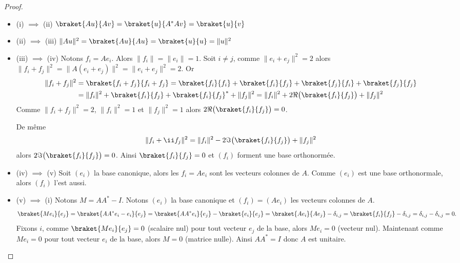 \documentclass[11pt,class=report,crop=false]{standalone}
\begin{document}
\begin{proof}~
\begin{itemize}
  \item (i) $\implies$ (ii) $\braket{Au}{Av} = \braket{u}{A^*Av} = \braket{u}{v}$

  \item (ii) $\implies$ (iii) $\| Au \|^2 = \braket{Au}{Au} = \braket{u}{u} = \| u \|^2$

  \item (iii) $\implies$ (iv) Notons $f_i = Ae_i$. Alors $\| f_i \| = \| e_i \| = 1$.
  Soit $i \neq j$, comme $\| e_i + e_j \|^2 = 2$ alors $\| f_i + f_j \|^2 = \| A(e_i + e_j) \|^2= \| e_i + e_j \|^2 =2$.
  Or
\begin{align*}
\|f_i+f_j\|^2 
&= \braket{f_i+f_j}{f_i+f_j} 
= \braket{f_i}{f_i} + \braket{f_i}{f_j} +\braket{f_j}{f_i} +\braket{f_j}{f_j} \\
&=  \|f_i\|^2 + \braket{f_i}{f_j} + \braket{f_i}{f_j}^* + \|f_j\|^2 
=  \|f_i\|^2 + 2\Re\big( \braket{f_i}{f_j} \big) + \|f_j\|^2 
\end{align*}
Comme $\|f_i+f_j\|^2 =2$, $\|f_i\|^2=1$ et $\|f_j\|^2=1$ alors $2\Re\big( \braket{f_i}{f_j}\big)=0$.

De même $$\|f_i+\ii f_j\|^2 =  \|f_i\|^2 - 2\Im\big( \braket{f_i}{f_j} \big) + \|f_j\|^2 $$ alors $2\Im\big( \braket{f_i}{f_j}\big)=0$. Ainsi $\braket{f_i}{f_j}=0$ et $(f_i)$ forment une base orthonormée.

  \item (iv) $\implies$ (v) Soit $(e_i)$ la base canonique, alors les $f_i = Ae_i$ sont les vecteurs colonnes de $A$. Comme $(e_i)$ est une base orthonormale, alors $(f_i)$ l'est aussi.

  \item (v) $\implies$ (i) 
  Notons $M = AA^* - I$. Notons $(e_i)$ la base canonique et $(f_i) = (Ae_i)$ les vecteurs colonnes de $A$.
$$\braket{Me_i}{e_j} 
= \braket{AA^*e_i - e_i}{e_j}
= \braket{AA^*e_i}{e_j} - \braket{e_i}{e_j}
= \braket{Ae_i}{Ae_j} - \delta_{i,j}
= \braket{f_i}{f_j} - \delta_{i,j}
= \delta_{i,j}- \delta_{i,j}
= 0.$$
 Fixons $i$, comme $\braket{Me_i}{e_j} = 0$ (scalaire nul) pour tout vecteur $e_j$ de la base, alors $Me_i=0$ (vecteur nul). Maintenant comme $Me_i=0$ pour tout vecteur $e_i$ de la base, alors $M=0$ (matrice nulle). Ainsi $AA^* = I$ donc $A$ est unitaire.
\end{itemize}
\end{proof}

\end{document}
